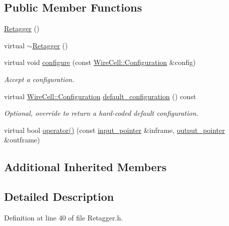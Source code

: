 \subsection*{Public Member Functions}
\begin{DoxyCompactItemize}
\item 
\hyperlink{class_wire_cell_1_1_gen_1_1_retagger_a5514b3966911c23c6b6b6061417d4680}{Retagger} ()
\item 
virtual \hyperlink{class_wire_cell_1_1_gen_1_1_retagger_ab38dec19bcb85e35abdd1fc2e064afa5}{$\sim$\+Retagger} ()
\item 
virtual void \hyperlink{class_wire_cell_1_1_gen_1_1_retagger_a8c198fcdc40f6254b5a33475f6a8e5bc}{configure} (const \hyperlink{namespace_wire_cell_a9f705541fc1d46c608b3d32c182333ee}{Wire\+Cell\+::\+Configuration} \&config)
\begin{DoxyCompactList}\small\item\em Accept a configuration. \end{DoxyCompactList}\item 
virtual \hyperlink{namespace_wire_cell_a9f705541fc1d46c608b3d32c182333ee}{Wire\+Cell\+::\+Configuration} \hyperlink{class_wire_cell_1_1_gen_1_1_retagger_a0fb8c413592ae2e5e169361384cce52a}{default\+\_\+configuration} () const
\begin{DoxyCompactList}\small\item\em Optional, override to return a hard-\/coded default configuration. \end{DoxyCompactList}\item 
virtual bool \hyperlink{class_wire_cell_1_1_gen_1_1_retagger_a4bbeda9e4329bfa262e8248f5a876267}{operator()} (const \hyperlink{class_wire_cell_1_1_i_function_node_a55c0946156df9b712b8ad1a0b59b2db6}{input\+\_\+pointer} \&inframe, \hyperlink{class_wire_cell_1_1_i_function_node_afc02f1ec60d31aacddf64963f9ca650b}{output\+\_\+pointer} \&outframe)
\end{DoxyCompactItemize}
\subsection*{Additional Inherited Members}


\subsection{Detailed Description}


Definition at line 40 of file Retagger.\+h.



